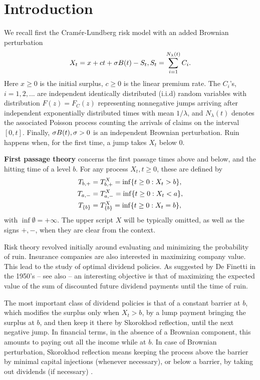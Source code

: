
\section{Introduction}

We recall first  the Cram\'{e}r-Lundberg risk
model  with an added Brownian perturbation \cite{dufresne1991risk,AA}
\begin{align} \la{CLp}
X_t = x + c t + \s B(t) -S_t, S_t=\sum_{i=1}^{N_\lambda (t)} C_i.
\end{align}
Here $x \geq 0$ is the initial surplus, $c \geq 0$ is the linear premium rate. The
 $C_i$'s, $i=1,2,...$ are independent identically distributed (i.i.d)
random variables with distribution ${F(z)=F_C(z)}$ representing
nonnegative jumps arriving after independent exponentially distributed
times with mean $1/\lambda$, and $N_\lambda (t)$ denotes the associated Poisson
process counting the arrivals of claims on the interval $[0,t]$. Finally, $\sigma B(t),  \sigma >0$
is an independent Brownian perturbation. Ruin happens when, for the first
 time, a jump takes $X_t$ below 0.
 
 {\bf First passage theory}  concerns the first passage times above and below, and the hitting  time of a level $b$. For any process $X_t, t \geq 0$, these are defined by
\begin{equation}\la{fpt}
\begin{aligned}
\tb &= \tb^{X}=\inf\{t\geq 0: X_t> b\},\\
\ta&=\ta^X=\inf\{t\geq 0: X_t< a\},\\
T_{\{b\}}&=T_{\{b\}}^X =\inf\{t\geq 0: X_t=b\},
\end{aligned}
\end{equation}
with $\inf\emptyset=+\infty$. The upper script $X$ will be typically  omitted, as well as the signs $+,-$, when they are clear from the context.


Risk theory revolved initially around evaluating and minimizing the
probability of ruin.  Insurance companies are also interested in maximizing
company value.  This lead to the study of optimal dividend policies.  As
suggested by De Finetti in the 1950's \cite{deF} -- see
also \cite{miller1961dividend} -- an interesting objective is that of
maximizing the expected value of the sum of discounted future dividend
payments until the time of ruin.


The most important class of dividend policies is that of a constant barrier
at $b$, which modifies the surplus only when $X_t>b$, by a lump payment
bringing the surplus at $b$, and then keep it there by Skorokhod
reflection, until the next negative jump.  In financial terms, in the
absence of a Brownian component, this amounts to paying out all the income
while at $b$.  In case of Brownian perturbation, Skorokhod reflection means
keeping the process above the barrier by minimal capital injections
(whenever necessary), or below a barrier, by taking out dividends (if
necessary) \cite{sk62}.

